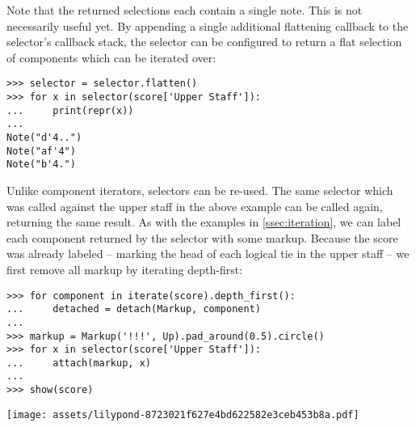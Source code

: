 \noindent Note that the returned selections each contain a single note. This is
not necessarily useful yet. By appending a single additional flattening
callback to the selector's callback stack, the selector can be configured to
return a flat selection of components which can be iterated over:

\begin{comment}
<abjad>
selector = selector.flatten()
for x in selector(score['Upper Staff']):
    print(repr(x))

</abjad>
\end{comment}

\begin{abjadbookoutput}
\begin{singlespacing}
\vspace{-0.5\baselineskip}
\begin{verbatim}
>>> selector = selector.flatten()
>>> for x in selector(score['Upper Staff']):
...     print(repr(x))
...
Note("d'4..")
Note("af'4")
Note("b'4.")
\end{verbatim}
\end{singlespacing}
\end{abjadbookoutput}

\noindent Unlike component iterators, selectors can be re-used. The same
selector which was called against the upper staff in the above example can be
called again, returning the same result. As with the examples in
\autoref{ssec:iteration}, we can label each component returned by the selector
with some markup. Because the score was already labeled -- marking the head of
each logical tie in the upper staff -- we first remove all markup by iterating
depth-first:

\begin{comment}
<abjad>
for component in iterate(score).depth_first():
    detached = detach(Markup, component)

markup = Markup('!!!', Up).pad_around(0.5).circle()
for x in selector(score['Upper Staff']):
    attach(markup, x)

show(score)
</abjad>
\end{comment}

\begin{abjadbookoutput}
\begin{singlespacing}
\vspace{-0.5\baselineskip}
\begin{verbatim}
>>> for component in iterate(score).depth_first():
...     detached = detach(Markup, component)
...
>>> markup = Markup('!!!', Up).pad_around(0.5).circle()
>>> for x in selector(score['Upper Staff']):
...     attach(markup, x)
...
>>> show(score)
\end{verbatim}
\noindent\texttt{[image: assets/lilypond-8723021f627e4bd622582e3ceb453b8a.pdf]}
\end{singlespacing}
\end{abjadbookoutput}


